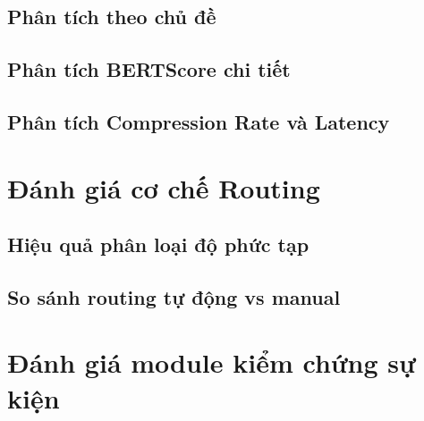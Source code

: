 \subsection{Phân tích theo chủ đề}

\subsection{Phân tích BERTScore chi tiết}

\subsection{Phân tích Compression Rate và Latency}

\section{Đánh giá cơ chế Routing}

\subsection{Hiệu quả phân loại độ phức tạp}

\subsection{So sánh routing tự động vs manual}

\section{Đánh giá module kiểm chứng sự kiện}

